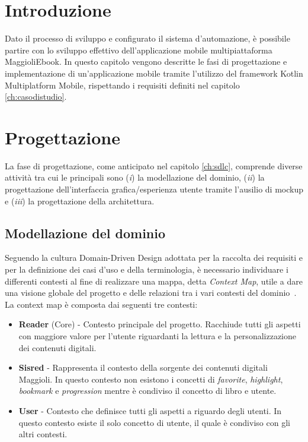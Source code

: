 
\section{Introduzione}
Dato il processo di sviluppo e configurato il sistema d'automazione,
è possibile partire con lo sviluppo effettivo dell'applicazione mobile multipiattaforma MaggioliEbook. 
In questo capitolo vengono descritte le fasi di progettazione e implementazione di un'applicazione mobile tramite l'utilizzo del framework Kotlin Multiplatform Mobile, 
rispettando i requisiti definiti nel capitolo \ref{ch:casodistudio}.

\section{Progettazione}
La fase di progettazione, 
come anticipato nel capitolo \ref{ch:sdlc}, 
comprende diverse attività tra cui le principali sono (\textit{i}) la modellazione del dominio,
(\textit{ii}) la progettazione dell'interfaccia grafica/esperienza utente tramite l'ausilio di mockup e (\textit{iii}) la progettazione della architettura.

\subsection{Modellazione del dominio}
Seguendo la cultura Domain-Driven Design adottata per la raccolta dei requisiti e per la definizione dei casi d'uso e della terminologia,
è necessario individuare i differenti contesti al fine di realizzare una mappa, 
detta \textit{Context Map}, 
utile a dare una visione globale del progetto e delle relazioni tra i vari contesti del dominio~\cite{evans_domain-driven_2004}. 
La context map è composta dai seguenti tre contesti:

\begin{itemize}
    \item \textbf{Reader} (Core) - Contesto principale del progetto. Racchiude tutti gli aspetti con maggiore valore per l'utente riguardanti la lettura e la personalizzazione dei contenuti digitali. 
    
    \item \textbf{Sisred} - Rappresenta il contesto della sorgente dei contenuti digitali Maggioli. In questo contesto non esistono i concetti di \textit{favorite}, \textit{highlight}, \textit{bookmark} e \textit{progression} mentre è condiviso il concetto di libro e utente.
    
    \item \textbf{User} - Contesto che definisce tutti gli aspetti a riguardo degli utenti. In questo contesto esiste il solo concetto di utente, il quale è condiviso con gli altri contesti.
\end{itemize}

